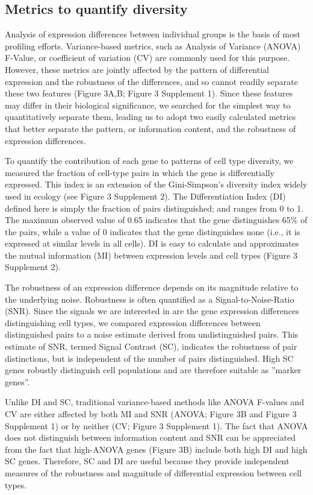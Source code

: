 \subsection{Metrics to quantify diversity}
Analysis of expression differences between individual groups is the basis of most profiling efforts. Variance-based metrics, such as Analysis of Variance (ANOVA) F-Value, or coefficient of variation (CV) are commonly used for this purpose. However, these metrics are jointly affected by the pattern of differential expression and the robustness of the differences, and so cannot readily separate these two features (Figure 3A,B; Figure 3 Supplement 1). Since these features may differ in their biological significance, we searched for the simplest way to quantitatively separate them, leading us to adopt two easily calculated metrics that better separate the pattern, or information content, and the robustness of expression differences.

To quantify the contribution of each gene to patterns of cell type diversity, we measured the fraction of cell-type pairs in which the gene is differentially expressed. This index is an extension of the Gini-Simpson's diversity index \citep{Simpson_1949} widely used in ecology (see Figure 3 Supplement 2). The Differentiation Index (DI) defined here is simply the fraction of pairs distinguished; and ranges from 0 to 1. The maximum observed value of 0.65 indicates that the gene distinguishes 65\% of the pairs, while a value of 0 indicates that the gene distinguishes none (i.e., it is expressed at similar levels in all cells). DI is easy to calculate and approximates the mutual information (MI) between expression levels and cell types (Figure 3 Supplement 2). 

The robustness of an expression difference depends on its magnitude relative to the underlying noise. Robustness is often quantified as a Signal-to-Noise-Ratio (SNR). Since the signals we are interested in are the gene expression differences distinguishing cell types, we compared expression differences between distinguished pairs to a noise estimate derived from undistinguished pairs. This estimate of SNR, termed Signal Contrast (SC), indicates the robustness of pair distinctions, but is independent of the number of pairs distinguished. High SC genes robustly distinguish cell populations and are therefore suitable as ”marker genes”. %

Unlike DI and SC, traditional variance-based methods like ANOVA F-values and CV are either affected by both MI and SNR (ANOVA; Figure 3B and Figure 3 Supplement 1) or by neither (CV; Figure 3 Supplement 1). The fact that ANOVA does not distinguish between information content and SNR can be appreciated from the fact that high-ANOVA genes (Figure 3B) include both high DI and high SC genes. Therefore, SC and DI are useful because they provide independent measures of the robustness and magnitude of differential expression between cell types.

